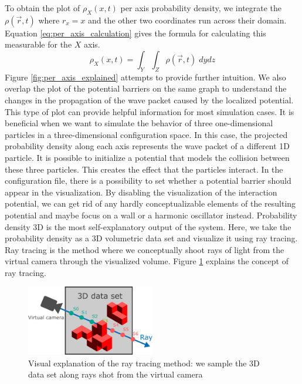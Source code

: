 To obtain the plot of $\rho_X(x, t)$ per axis probability density, we integrate the $\rho(\vec{r}, t)$ where $r_x = x$ and the other two coordinates run across their domain.
Equation \ref{eq:per_axis_calculation} gives the formula for calculating this measurable for the $X$ axis.
\begin{equation}
	\rho_X(x, t) = \int_Y \int_Z \rho(\vec{r}, t)\; dy dz
	\label{eq:per_axis_calculation}
\end{equation}
Figure \ref{fig:per_axis_explained} attempts to provide further intuition.
We also overlap the plot of the potential barriers on the same graph to understand the changes in the propagation of the wave packet caused by the localized potential.
This type of plot can provide helpful information for most simulation cases. It is beneficial when we want to simulate the behavior of three one-dimensional particles in a three-dimensional configuration space.
In this case, the projected probability density along each axis represents the wave packet of a different 1D particle.
It is possible to initialize a potential that models the collision between these three particles.
This creates the effect that the particles interact.
In the configuration file, there is a possibility to set whether a potential barrier should appear in the visualization.
By disabling the visualization of the interaction potential, we can get rid of any hardly conceptualizable elements of the resulting potential and maybe focus on a wall or a harmonic oscillator instead.
Probability density 3D is the most self-explanatory output of the system.
Here, we take the probability density as a 3D volumetric data set and visualize it using ray tracing.
Ray tracing is the method where we conceptually shoot rays of light from the virtual camera through the visualized volume.
Figure \ref{fig:ray_tracing_method} explains the concept of ray tracing.
\begin{figure}[hbt!]
	\centering
	\includegraphics[width=0.5\textwidth]{figures/ray_tracing_visualization.pdf}
	\caption{Visual explanation of the ray tracing method: we sample the 3D data set along rays shot from the virtual camera}
	\label{fig:ray_tracing_method}
\end{figure}
